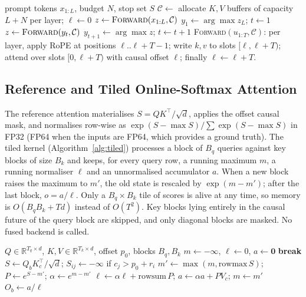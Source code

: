 \documentclass[conference]{IEEEtran}
\begin{document}
\begin{algorithm}[t]
\caption{Greedy decoding with an explicit KV cache}\label{alg:kv}
\begin{algorithmic}[1]
\Require prompt tokens $x_{1:L}$, budget $N$, stop set $S$
\State $\mathcal{C} \gets$ allocate $K,V$ buffers of capacity $L{+}N$ per layer; $\ell\gets0$
\State $z \gets \textsc{Forward}(x_{1:L}, \mathcal{C})$ 
\State $y_1 \gets \arg\max z_L$;\; $t\gets1$
  \State $z \gets \textsc{Forward}(y_t, \mathcal{C})$ 
  \State $y_{t+1}\gets\arg\max z$;\; $t\gets t{+}1$
\EndWhile
\Statex \textsc{Forward}$(u_{1:T},\mathcal{C})$: per layer, apply RoPE at positions $\ell..\ell{+}T{-}1$; write $k,v$ to slots $[\ell,\ell{+}T)$; attend over slots $[0,\ell{+}T)$ with causal offset $\ell$; finally $\ell\gets\ell{+}T$.
\end{algorithmic}
\end{algorithm}

\subsection{Reference and Tiled Online-Softmax Attention}\label{sec:attn}
The reference attention materialises $S=QK^\top/\sqrt{d}$, applies the offset causal mask, and normalises row-wise as $\exp(S-\max S)/\sum\exp(S-\max S)$ in FP32 (FP64 when the inputs are FP64, which provides a ground truth). The tiled kernel (Algorithm~\ref{alg:tiled}) processes a block of $B_q$ queries against key blocks of size $B_k$ and keeps, for every query row, a running maximum $m$, a running normaliser $\ell$ and an unnormalised accumulator $a$. When a new block raises the maximum to $m'$, the old state is rescaled by $\exp(m-m')$; after the last block, $o=a/\ell$. Only a $B_q\times B_k$ tile of scores is alive at any time, so memory is $O(B_qB_k + T d)$ instead of $O(T^2)$. Key blocks lying entirely in the causal future of the query block are skipped, and only diagonal blocks are masked. No fused backend is called.

\begin{algorithm}[t]
\caption{Tiled causal attention with online softmax}\label{alg:tiled}
\begin{algorithmic}[1]
\Require $Q\in\mathbb{R}^{T_q\times d}$, $K,V\in\mathbb{R}^{T_k\times d}$, offset $p_0$, blocks $B_q,B_k$
  \State $m\gets-\infty$, $\ell\gets0$, $a\gets\mathbf{0}$
     \textbf{break} \EndIf
    \State $S\gets Q_bK_c^\top/\sqrt d$;\; $S_{ij}{\gets}{-}\infty$ if $c_j{>}p_0{+}r_i$
    \State $m'{\gets}\max(m,\mathrm{rowmax}\,S)$; $P{\gets}e^{S-m'}$; $\alpha{\gets}e^{m-m'}$
    \State $\ell\gets\alpha\ell+\mathrm{rowsum}\,P$;\; $a\gets\alpha a+PV_c$;\; $m\gets m'$
  \EndFor
  \State $O_b\gets a/\ell$
\EndFor
\end{algorithmic}
\end{algorithm}
\end{document}
